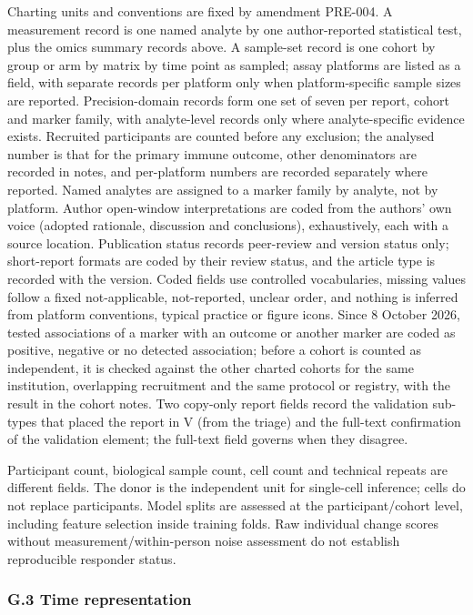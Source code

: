 \documentclass[
  11pt,
  a4paper,
]{article}
\begin{document}
Charting units and conventions are fixed by amendment PRE-004. A
measurement record is one named analyte by one author-reported
statistical test, plus the omics summary records above. A sample-set
record is one cohort by group or arm by matrix by time point as sampled;
assay platforms are listed as a field, with separate records per
platform only when platform-specific sample sizes are reported.
Precision-domain records form one set of seven per report, cohort and
marker family, with analyte-level records only where analyte-specific
evidence exists. Recruited participants are counted before any
exclusion; the analysed number is that for the primary immune outcome,
other denominators are recorded in notes, and per-platform numbers are
recorded separately where reported. Named analytes are assigned to a
marker family by analyte, not by platform. Author open-window
interpretations are coded from the authors' own voice (adopted
rationale, discussion and conclusions), exhaustively, each with a source
location. Publication status records peer-review and version status
only; short-report formats are coded by their review status, and the
article type is recorded with the version. Coded fields use controlled
vocabularies, missing values follow a fixed not-applicable,
not-reported, unclear order, and nothing is inferred from platform
conventions, typical practice or figure icons. Since 8 October 2026,
tested associations of a marker with an outcome or another marker are
coded as positive, negative or no detected association; before a cohort
is counted as independent, it is checked against the other charted
cohorts for the same institution, overlapping recruitment and the same
protocol or registry, with the result in the cohort notes. Two copy-only
report fields record the validation sub-types that placed the report in
V (from the triage) and the full-text confirmation of the validation
element; the full-text field governs when they disagree.

Participant count, biological sample count, cell count and technical
repeats are different fields. The donor is the independent unit for
single-cell inference; cells do not replace participants. Model splits
are assessed at the participant/cohort level, including feature
selection inside training folds. Raw individual change scores without
measurement/within-person noise assessment do not establish reproducible
responder status.

\subsubsection{G.3 Time representation}\label{g.3-time-representation}
\end{document}
